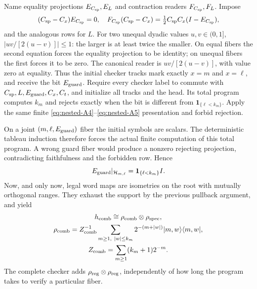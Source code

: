 Name equality projections $E_{C_{\rm sp}},E_L$ and contraction readers $F_{C_{\rm sp}},F_L$.
Impose
\begin{equation}
 (C_{\rm sp}-C_x)E_{C_{\rm sp}}=0,\quad
 F_{C_{\rm sp}}(C_{\rm sp}-C_x)=\tfrac12C_{\rm sp} C_x(I-E_{C_{\rm sp}}),                              \label{eq:nested-A9}
\end{equation}
and the analogous rows for $L$. For two unequal dyadic values
$u,v\in(0,1]$, $|uv/[2(u-v)]|\le1$: the larger is at least twice
the smaller. On equal fibers the second equation forces the equality
projection to be identity; on unequal fibers the first forces it to
be zero. The canonical reader is $uv/[2(u-v)]$, with value zero at
equality. Thus the initial checker tracks mark exactly $x=m$ and
$x=\ell$, and receive the bit ${E_{\rm guard}}$. Require every checker label to
commute with $C_{\rm sp},L,{E_{\rm guard}},C_x,C_t$, and initialize all tracks and the head.
Its total program computes $k_m$ and rejects exactly when the bit
is different from $\mathbf1_{\{\ell<k_m\}}$. Apply the same finite
\eqref{eq:nested-A4}--\eqref{eq:nested-A5} presentation and forbid rejection.

On a joint $(m,\ell,{E_{\rm guard}})$ fiber the initial symbols are scalars. The
deterministic tableau induction therefore forces the actual finite
computation of this total program. A wrong guard fiber would produce
a nonzero rejecting projection, contradicting faithfulness and the
forbidden row. Hence
\begin{equation}
             {E_{\rm guard}}|_{\mathcal H_{m,\ell}}=\mathbf1_{\{\ell<k_m\}}I.       \label{eq:nested-A10}
\end{equation}
Now, and only now, legal word maps are isometries on the root with
mutually orthogonal ranges. They exhaust the support by the previous
pullback argument, and yield
\begin{equation}
 \begin{gathered}h_{\rm comb}\cong\rho_{\rm comb}\otimes\rho_{\rm spec},\\
 \rho_{\rm comb}=Z_{\rm comb}^{-1}\sum_{m\ge1,\ |w|\le k_m}
       2^{-(m+|w|)}|m,w\rangle\langle m,w|,\\
 Z_{\rm comb}=\sum_{m\ge1}(k_m+1)2^{-m}.\end{gathered}                                \label{eq:nested-A11}
\end{equation}
The complete checker adds $\rho_{\rm reg}\otimes\rho_{\rm reg}$, independently of how
long the program takes to verify a particular fiber.

